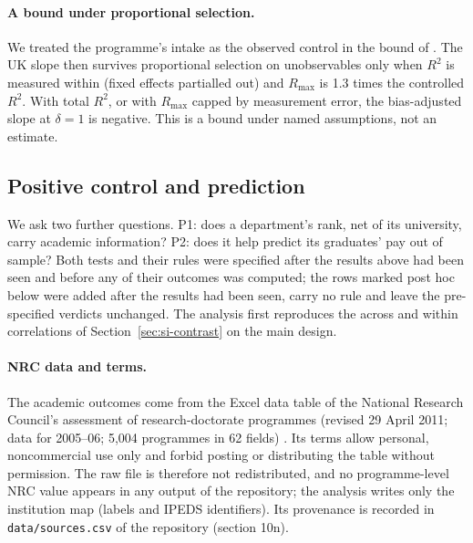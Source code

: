 \documentclass[11pt]{article}
\begin{document}
\paragraph{A bound under proportional selection.} We treated the programme's intake as the observed
control in the bound of \citet{oster2019unobservable}. The UK slope then survives proportional selection on
unobservables only when $R^2$ is measured within (fixed effects partialled out) and $R_{\max}$ is 1.3 times the
controlled $R^2$. With total $R^2$, or with $R_{\max}$ capped by measurement error, the bias-adjusted slope at $\delta=1$
is negative. This is a
bound under named assumptions, not an estimate.

\subsection{Positive control and prediction}\label{sec:si-pcp}

We ask two further questions. P1: does a department's rank, net of its university, carry academic information? P2:
does it help predict its graduates' pay out of sample? Both tests and their rules were specified after the results
above had been seen and before any of their outcomes was computed; the rows marked post hoc below were added after
the results had been seen, carry no rule and leave the pre-specified verdicts unchanged. The analysis first
reproduces the across and within correlations of Section~\ref{sec:si-contrast} on the main design.

\paragraph{NRC data and terms.} The academic outcomes come from the Excel data table of the National Research
Council's assessment of research-doctorate programmes (revised 29 April 2011; data for 2005--06; 5,004 programmes in
62 fields) \citep{nrc2011data}. Its terms allow personal, noncommercial use only and forbid posting or distributing
the table without permission. The raw file is therefore not redistributed, and no programme-level NRC value appears in
any output of the repository; the analysis writes only the institution map (labels and IPEDS identifiers). Its
provenance is recorded in \texttt{data/sources.csv} of the repository (section 10n).
\end{document}
